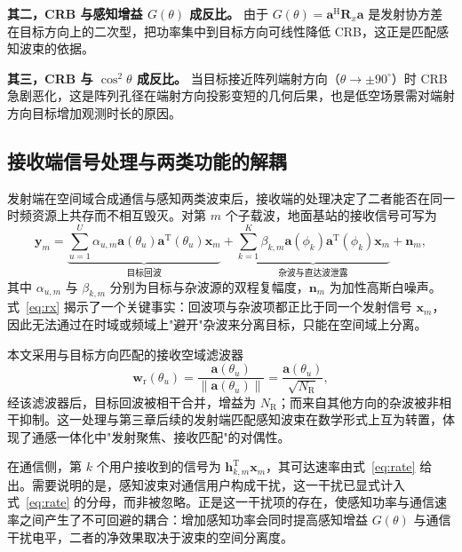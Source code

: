 \textbf{其二，CRB 与感知增益 $G(\theta)$ 成反比。} 由于 $G(\theta)=\mathbf{a}^{\mathrm{H}}\mathbf{R}_{x}\mathbf{a}$ 是发射协方差在目标方向上的二次型，把功率集中到目标方向可线性降低 CRB，这正是匹配感知波束的依据。

\textbf{其三，CRB 与 $\cos^{2}\theta$ 成反比。} 当目标接近阵列端射方向（$\theta\to\pm90^{\circ}$）时 CRB 急剧恶化，这是阵列孔径在端射方向投影变短的几何后果，也是低空场景需对端射方向目标增加观测时长的原因。

\subsection{接收端信号处理与两类功能的解耦}
\label{sec:receiver}

发射端在空间域合成通信与感知两类波束后，接收端的处理决定了二者能否在同一时频资源上共存而不相互毁灭。对第 $m$ 个子载波，地面基站的接收信号可写为
\begin{equation}
  \mathbf{y}_{m} = \underbrace{\sum_{u=1}^{U}\alpha_{u,m}\mathbf{a}(\theta_u)\mathbf{a}^{\mathrm{T}}(\theta_u)\mathbf{x}_{m}}_{\text{目标回波}}
  + \underbrace{\sum_{k=1}^{K}\beta_{k,m}\mathbf{a}(\phi_k)\mathbf{a}^{\mathrm{T}}(\phi_k)\mathbf{x}_{m}}_{\text{杂波与直达波泄露}}
  + \mathbf{n}_{m},
  \label{eq:rx}
\end{equation}
其中 $\alpha_{u,m}$ 与 $\beta_{k,m}$ 分别为目标与杂波源的双程复幅度，$\mathbf{n}_{m}$ 为加性高斯白噪声。式~\eqref{eq:rx} 揭示了一个关键事实：回波项与杂波项都正比于同一个发射信号 $\mathbf{x}_{m}$，因此无法通过在时域或频域上"避开"杂波来分离目标，只能在空间域上分离。

本文采用与目标方向匹配的接收空域滤波器
\begin{equation}
  \mathbf{w}_{\mathrm{r}}(\theta_u) = \frac{\mathbf{a}(\theta_u)}{\|\mathbf{a}(\theta_u)\|} = \frac{\mathbf{a}(\theta_u)}{\sqrt{N_{\mathrm{R}}}},
  \label{eq:rx_filter}
\end{equation}
经该滤波器后，目标回波被相干合并，增益为 $N_{\mathrm{R}}$；而来自其他方向的杂波被非相干抑制。这一处理与第三章后续的发射端匹配感知波束在数学形式上互为转置，体现了通感一体化中"发射聚焦、接收匹配"的对偶性。

在通信侧，第 $k$ 个用户接收到的信号为 $\mathbf{h}_{k,m}^{\mathrm{T}}\mathbf{x}_{m}$，其可达速率由式~\eqref{eq:rate} 给出。需要说明的是，感知波束对通信用户构成干扰，这一干扰已显式计入式~\eqref{eq:rate} 的分母，而非被忽略。正是这一干扰项的存在，使感知功率与通信速率之间产生了不可回避的耦合：增加感知功率会同时提高感知增益 $G(\theta)$ 与通信干扰电平，二者的净效果取决于波束的空间分离度。

